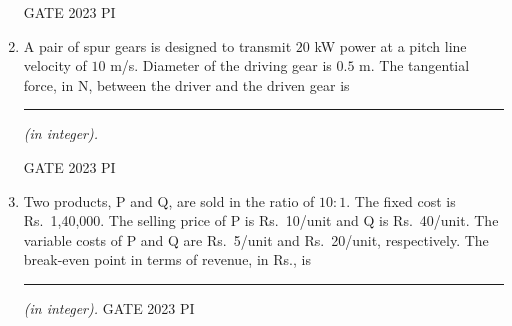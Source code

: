 \documentclass[journal,12pt,onecolumn]{IEEEtran}
\theoremstyle{remark}
\begin{document}
\begin{enumerate}
\hfill{GATE 2023 PI}
\item A pair of spur gears is designed to transmit $20$ kW power at a pitch line velocity of $10$ m/s. Diameter of the driving gear is $0.5$ m. The tangential force, in N, between the driver and the driven gear is \rule{3cm}{0.15mm} \textit{(in integer).}

\hfill{GATE 2023 PI}

\item Two products, P and Q, are sold in the ratio of $10\!:\!1$. The fixed cost is Rs.~1,40,000. The selling price of P is Rs.~10/unit and Q is Rs.~40/unit. The variable costs of P and Q are Rs.~5/unit and Rs.~20/unit, respectively. The break-even point in terms of revenue, in Rs., is \rule{3cm}{0.15mm} \textit{(in integer).}
\hfill{GATE 2023 PI}















































































\end{enumerate}
\end{document}
